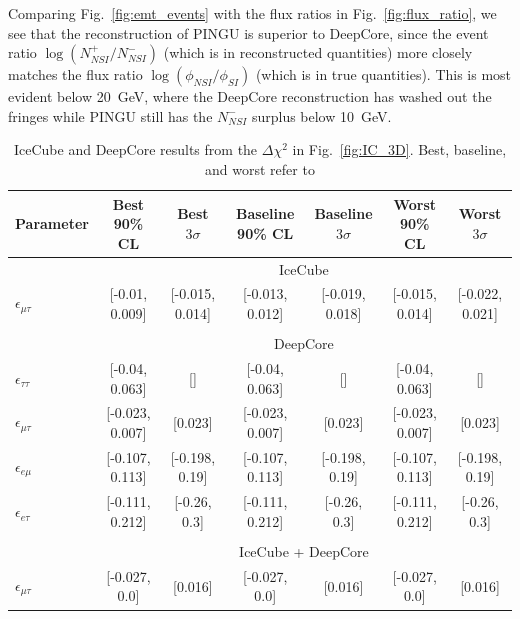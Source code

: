 \documentclass[draft=True]{revtex4-2}
\begin{document}
{Comparing Fig.~\ref{fig:emt_events} with the flux ratios in Fig.~\ref{fig:flux_ratio}, we see that the reconstruction of PINGU is
superior to DeepCore, since the event ratio $\log{(N^+_{NSI}/N^-_{NSI})}$ (which is in reconstructed quantities) more closely matches the flux ratio $\log{(\phi_{NSI}/\phi_{SI})}$ (which is in true quantities).
This is most evident below \SI{20}{\GeV}, where the DeepCore reconstruction has washed out the fringes while PINGU still has the $N^-_{NSI}$ surplus below \SI{10}{\GeV}.

{\renewcommand{\arraystretch}{1.3}
 \begin{table}
   \begin{center}
   \begin{tabular}{lcccccc}
      \hline \hline
      Parameter & Best 90\% CL & Best $3\sigma$& Baseline 90\% CL & Baseline $3\sigma$ & Worst 90\% CL & Worst $3\sigma$\\
      \hline & \multicolumn{6}{c}{IceCube}  \\
      $\epsilon_{\mu\tau}$  &   [-0.01, 0.009] &  [-0.015, 0.014] &  [-0.013, 0.012] &  [-0.019, 0.018] &  [-0.015, 0.014] &  [-0.022, 0.021] \\\\
      & \multicolumn{6}{c}{DeepCore}\\ [0.3em]
      $\epsilon_{\tau\tau}$ &   [-0.04, 0.063] &               [] &   [-0.04, 0.063] &               [] &   [-0.04, 0.063] &               [] \\
      $\epsilon_{\mu\tau}$  &  [-0.023, 0.007] &          [0.023] &  [-0.023, 0.007] &          [0.023] &  [-0.023, 0.007] &          [0.023] \\
      $\epsilon_{e\mu}$     &  [-0.107, 0.113] &   [-0.198, 0.19] &  [-0.107, 0.113] &   [-0.198, 0.19] &  [-0.107, 0.113] &   [-0.198, 0.19] \\
      $\epsilon_{e\tau}$    &  [-0.111, 0.212] &     [-0.26, 0.3] &  [-0.111, 0.212] &     [-0.26, 0.3] &  [-0.111, 0.212] &     [-0.26, 0.3] \\\\
      &\multicolumn{6}{c}{IceCube + DeepCore}\\
      $\epsilon_{\mu\tau}$  &    [-0.027, 0.0] &          [0.016] &    [-0.027, 0.0] &          [0.016] &    [-0.027, 0.0] &          [0.016] \\
      \hline
      \hline
   \end{tabular}
   \end{center}
   \caption{IceCube and DeepCore results from the $\Delta \chi^2$ in Fig.~\ref{fig:IC_3D}. Best, baseline, and worst refer to 
}
\end{table}}}
\end{document}
